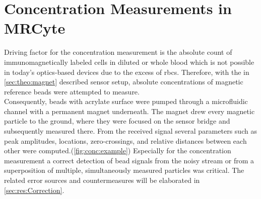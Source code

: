 \section{Concentration Measurements in MRCyte}
Driving factor for the concentration measurement is the absolute count of immunomagnetically labeled cells in diluted or whole blood which is not possible in today's optics-based devices due to the excess of \glspl{rbc}.\cite{lit:bio:Alberts} Therefore, with the in \cref{sec:theo:magnet} described sensor setup, absolute concentrations of magnetic reference beads were attempted to measure.\\
Consequently, beads with acrylate surface were pumped through a microfluidic channel with a permanent magnet underneath. The magnet drew every magnetic particle to the ground, where they were focused on the sensor bridge and subsequently measured there. From the received signal several parameters such as peak amplitudes, locations, zero-crossings, and relative distances between each other were computed.(\cref{fig:conc:example}) Especially for the concentration measurement a correct detection of bead signals from the noisy stream or from a superposition of multiple, simultaneously measured particles was critical. The related error sources and countermeasures will be elaborated in \cref{sec:res:Correction}.

